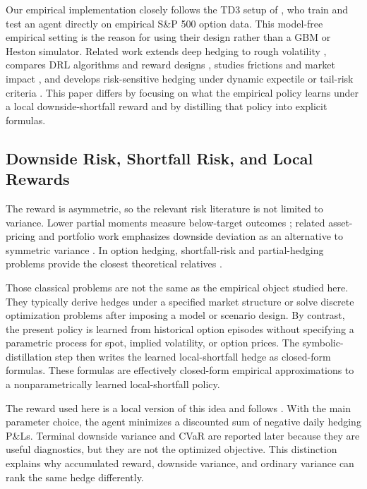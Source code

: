\documentclass[a4paper,12pt]{article}
\numberwithin{equation}{section}
\begin{document}
Our empirical implementation closely follows the TD3 setup of \citet{mikkila2023empirical}, who train and test an agent directly on empirical S\&P 500 option data. This model-free empirical setting is the reason for using their design rather than a GBM or Heston simulator. Related work extends deep hedging to rough volatility \citep{horvath2021deep}, compares DRL algorithms and reward designs \citep{pickard2023deep}, studies frictions and market impact \citep{huang2025deep}, and develops risk-sensitive hedging under dynamic expectile or tail-risk criteria \citep{marzban2023deep,peng2024risk}. This paper differs by focusing on what the empirical policy learns under a local downside-shortfall reward and by distilling that policy into explicit formulas.

\subsection{Downside Risk, Shortfall Risk, and Local Rewards}

The reward is asymmetric, so the relevant risk literature is not limited to variance. Lower partial moments measure below-target outcomes \citep{fishburn1977mean,bawa1975optimal}; related asset-pricing and portfolio work emphasizes downside deviation as an alternative to symmetric variance \citep{harlow1989asset,harlow1991asset,sortino1991downside}. In option hedging, shortfall-risk and partial-hedging problems provide the closest theoretical relatives \citep{follmer2000efficient,schulmerich2003local,coleman2003discrete}.

Those classical problems are not the same as the empirical object studied here. They typically derive hedges under a specified market structure or solve discrete optimization problems after imposing a model or scenario design. By contrast, the present policy is learned from historical option episodes without specifying a parametric process for spot, implied volatility, or option prices. The symbolic-distillation step then writes the learned local-shortfall hedge as closed-form formulas. These formulas are effectively closed-form empirical approximations to a nonparametrically learned local-shortfall policy.

The reward used here is a local version of this idea and follows \citet{mikkila2023empirical}. With the main parameter choice, the agent minimizes a discounted sum of negative daily hedging P\&Ls. Terminal downside variance and CVaR are reported later because they are useful diagnostics, but they are not the optimized objective. This distinction explains why accumulated reward, downside variance, and ordinary variance can rank the same hedge differently.
\end{document}
